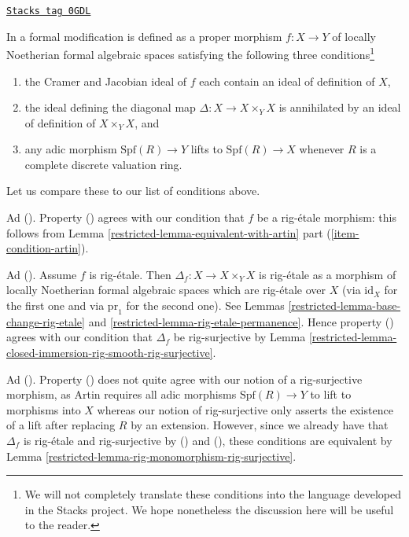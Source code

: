 \begin{remark}
\label{restricted-remark-compare-formal-modification-artin}
\href{https://stacks.math.columbia.edu/tag/0GDL}{\texttt{Stacks tag 0GDL}}

In \cite[Definition 1.7]{ArtinII} a formal modification is defined as a
proper morphism $f : X \to Y$ of locally Noetherian formal algebraic spaces
satisfying the following three conditions\footnote{We will not completely
translate these conditions into the language developed in the Stacks
project. We hope nonetheless the discussion here will be useful to the
reader.}
\begin{enumerate}
\item[(\romannumeral1)] the Cramer and Jacobian ideal of
$f$ each contain an ideal of definition of $X$,
\item[(\romannumeral2)] the ideal defining the
diagonal map $\Delta : X \to X \times_Y X$
is annihilated by an ideal of definition of $X \times_Y X$, and
\item[(\romannumeral3)] any adic morphism $\text{Spf}(R) \to Y$
lifts to $\text{Spf}(R) \to X$ whenever $R$ is a
complete discrete valuation ring.
\end{enumerate}
Let us compare these to our list of conditions above.

\medskip\noindent
Ad (). Property () agrees with our condition
that $f$ be a rig-\'etale morphism: this follows from
Lemma \ref{restricted-lemma-equivalent-with-artin} part (\ref{item-condition-artin}).

\medskip\noindent
Ad (). Assume $f$ is rig-\'etale. Then
$\Delta_f : X \to X \times_Y X$ is rig-\'etale as a morphism
of locally Noetherian formal algebraic spaces which are
rig-\'etale over $X$ (via $\text{id}_X$ for the first one and via
$\text{pr}_1$ for the second one).
See Lemmas \ref{restricted-lemma-base-change-rig-etale} and
\ref{restricted-lemma-rig-etale-permanence}.
Hence property () agrees with our condition
that $\Delta_f$ be rig-surjective by
Lemma \ref{restricted-lemma-closed-immersion-rig-smooth-rig-surjective}.

\medskip\noindent
Ad (). Property () does not quite
agree with our notion of a rig-surjective morphism, as Artin
requires all adic morphisms $\text{Spf}(R) \to Y$ to lift to
morphisms into $X$ whereas our notion of rig-surjective only
asserts the existence of a lift after replacing $R$ by an extension.
However, since we already have that $\Delta_f$ is
rig-\'etale and rig-surjective by () and (),
these conditions are equivalent by
Lemma \ref{restricted-lemma-rig-monomorphism-rig-surjective}.
\end{remark}

